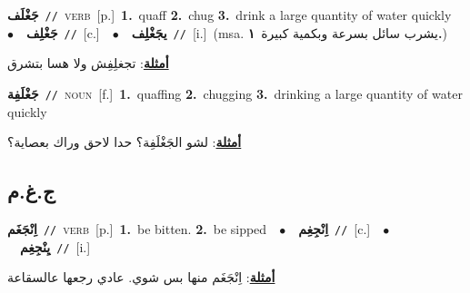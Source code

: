 \documentclass[10pt,a4paper,twoside]{article} %
\begin{document}
\begin{multicols}{2}
{\setlength\topsep{0pt}\textbf{\foreignlanguage{arabic}{جَغْلَف}}\ {\color{gray}\texttt{//}\color{black}}\ \textsc{verb}\ [p.]\ \textbf{1.}~quaff  \textbf{2.}~chug  \textbf{3.}~drink a large quantity of water quickly\ \ $\bullet$\ \ \setlength\topsep{0pt}\textbf{\foreignlanguage{arabic}{جَغْلِف}}\ {\color{gray}\texttt{//}\color{black}}\ [c.]\ \ $\bullet$\ \ \setlength\topsep{0pt}\textbf{\foreignlanguage{arabic}{يجَغْلِف}}\ {\color{gray}\texttt{//}\color{black}}\ [i.]\ \color{gray}(msa. \foreignlanguage{arabic}{يشرب سائل بسرعة وبكمية كبيرة}~\foreignlanguage{arabic}{\textbf{١.}})\color{black}\  \begin{flushright}\color{gray}\foreignlanguage{arabic}{\textbf{\underline{\foreignlanguage{arabic}{أمثلة}}}: تجغلِفِش ولا هسا بتشرق}\end{flushright}\color{black}} \vspace{2mm}

{\setlength\topsep{0pt}\textbf{\foreignlanguage{arabic}{جَغْلَفِة}}\ {\color{gray}\texttt{//}\color{black}}\ \textsc{noun}\ [f.]\ \textbf{1.}~quaffing  \textbf{2.}~chugging  \textbf{3.}~drinking a large quantity of water quickly\  \begin{flushright}\color{gray}\foreignlanguage{arabic}{\textbf{\underline{\foreignlanguage{arabic}{أمثلة}}}: لشو الجَغْلَفِة؟ حدا لاحق وراك بعصاية؟}\end{flushright}\color{black}} \vspace{2mm}

\vspace{-3mm}
\subsection*{\color{blue}\foreignlanguage{arabic}{ج.غ.م}\color{blue}{}} 

{\setlength\topsep{0pt}\textbf{\foreignlanguage{arabic}{اِنْجَغَم}}\ {\color{gray}\texttt{//}\color{black}}\ \textsc{verb}\ [p.]\ \textbf{1.}~be bitten.  \textbf{2.}~be sipped\ \ $\bullet$\ \ \setlength\topsep{0pt}\textbf{\foreignlanguage{arabic}{اِنْجِغِم}}\ {\color{gray}\texttt{//}\color{black}}\ [c.]\ \ $\bullet$\ \ \setlength\topsep{0pt}\textbf{\foreignlanguage{arabic}{يِنْجِغِم}}\ {\color{gray}\texttt{//}\color{black}}\ [i.]\  \begin{flushright}\color{gray}\foreignlanguage{arabic}{\textbf{\underline{\foreignlanguage{arabic}{أمثلة}}}: اِنْجَغَم منها بس شوي. عادي رجعها عالسقاعة}\end{flushright}\color{black}} \vspace{2mm}


\end{multicols}
\end{document}
